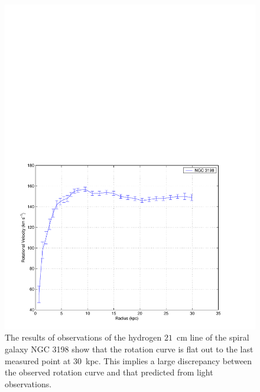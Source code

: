 \newpage

\begin{figure}[p]
\begin{center}
\includegraphics[width=\linewidth]{figures/macho/ngc3198}
\end{center}
\caption[H1 Rotation Curve of NGC 3198]{%
\label{f:rotcurves}
The results of observations of the hydrogen $21$~cm line of the spiral galaxy
NGC 3198 show that the rotation curve is flat out to the last measured point
at $30$~kpc\cite{1989A&A...223...47B}. This implies a large discrepancy
between the observed rotation curve and that predicted from light
observations.
}
\end{figure}

